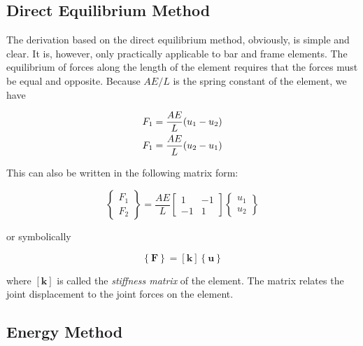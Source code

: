 \documentclass[
10pt,
a4paper,
openany,
svgnames,
]{book}
\begin{document}
\subsection{Direct Equilibrium Method}

The derivation based on the direct equilibrium method, obviously, is simple and clear. It is, however, only practically applicable to bar and frame elements. The equilibrium of forces along the length of the element requires that the forces must be equal and opposite. Because $AE / L$ is the spring constant of the element, we have

\begin{equation}
  \begin{gathered}
    F_1 = \frac{AE}{L}(u_1 - u_2) \hfill \\
    F_1 = \frac{AE}{L}(u_2 - u_1) \hfill \\ 
  \end{gathered}
\end{equation}

This can also be written in the following matrix form:

\begin{equation} \label{eqn: stiffness matrix equilibrium}
  \left\{
    \begin{array}{*{20}{c}}
      F_1 \\ 
      F_2 
    \end{array} \right\} = \frac{AE}{L}\left[
    \begin{array}{*{20}{c}}
      1 & -1 \\ 
     -1 & 1 
   \end{array} \right]\left\{
    \begin{array}{*{20}{c}}
    u_1 \\ 
    u_2 
   \end{array} \right\}
\end{equation}

or symbolically

\begin{equation}
  \left\{ \mathbf{F} \right\} = \left[ \mathbf{k} \right]\left\{ \mathbf{u} \right\}
\end{equation}

where $[\mathbf{k}]$ is called the \emph{stiffness matrix} of the element. The matrix relates the joint displacement to the joint forces on the element.

\subsection{Energy Method}
\end{document}

